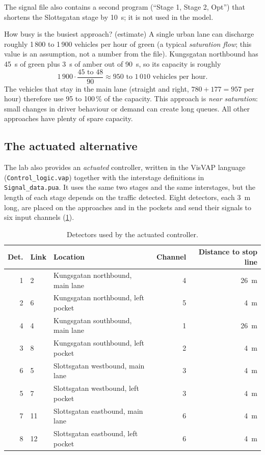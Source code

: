 \documentclass[11pt,a4paper]{article}
\newcommand{\code}[1]{\texttt{#1}}
\begin{document}
The signal file also contains a second program (``Stage 1, Stage 2, Opt'') that shortens the
Slottsgatan stage by 10~s; it is not used in the model.

\begin{plainbox}{How busy is the busiest approach? (estimate)}
A single urban lane can discharge roughly 1\,800 to 1\,900 vehicles per hour of green (a typical
\emph{saturation flow}; this value is an assumption, not a number from the file). Kungsgatan
northbound has 45~s of green plus 3~s of amber out of 90~s, so its capacity is roughly
\[
1\,900 \cdot \frac{45 \text{ to } 48}{90} \approx 950 \text{ to } 1\,010 \text{ vehicles per hour}.
\]
The vehicles that stay in the main lane (straight and right, $780 + 177 = 957$ per hour) therefore
use 95 to 100\,\% of the capacity. This approach is \emph{near saturation}: small changes in driver
behaviour or demand can create long queues. All other approaches have plenty of spare capacity.
\end{plainbox}

\subsection{The actuated alternative}
\label{sec:actuated}

The lab also provides an \emph{actuated} controller, written in the VisVAP language
(\code{Control\_logic.vap}) together with the interstage definitions in \code{Signal\_data.pua}. It
uses the same two stages and the same interstages, but the length of each stage depends on the
traffic detected. Eight detectors, each 3~m long, are placed on the approaches and in the pockets
and send their signals to six input channels (\cref{tab:detectors}).

\begin{table}[!htb]
\centering
\caption[Detectors]{Detectors used by the actuated controller.}
\label{tab:detectors}
\small
\begin{tabular}{rllrr}
\toprule
\textbf{Det.} & \textbf{Link} & \textbf{Location} & \textbf{Channel} & \textbf{Distance to stop line}\\
\midrule
1 & 2  & Kungsgatan northbound, main lane     & 4 & 26~m\\
2 & 6  & Kungsgatan northbound, left pocket   & 5 & 4~m\\
4 & 4  & Kungsgatan southbound, main lane     & 1 & 26~m\\
3 & 8  & Kungsgatan southbound, left pocket   & 2 & 4~m\\
6 & 5  & Slottsgatan westbound, main lane     & 3 & 4~m\\
5 & 7  & Slottsgatan westbound, left pocket   & 3 & 4~m\\
7 & 11 & Slottsgatan eastbound, main lane     & 6 & 4~m\\
8 & 12 & Slottsgatan eastbound, left pocket   & 6 & 4~m\\
\bottomrule
\end{tabular}
\end{table}
\end{document}
